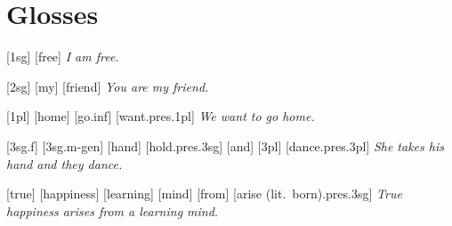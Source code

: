 \documentclass{article}
\begin{document}
\newpage\section{Glosses}

\ex[lingstyle=custom_nlevel]
\begingl
{}[{\sc 1sg}]
[free]
\glft \textit{I am free.}
\endgl
\xe

\ex[lingstyle=custom_nlevel]
\begingl
{}[{\sc 2sg}]
[my]
[friend]
\glft \textit{You are my friend.}
\endgl
\xe

\ex[lingstyle=custom_nlevel]
\begingl
{}[{\sc 1pl}]
[home]
[go.{\sc inf}]
[want.{\sc pres.1pl}]
\glft \textit{We want to go home.}
\endgl
\xe

\ex[lingstyle=custom_nlevel]
\begingl
{}[{\sc 3sg.f}]
[{\sc 3sg.m}-{\sc gen}]
[hand]
[hold.{\sc pres.3sg}]
[and]
[{\sc 3pl}]
[dance.{\sc pres.3pl}]
\glft \textit{She takes his hand and they dance.}
\endgl
\xe

\ex[lingstyle=custom_nlevel]
\begingl
{}[true]
[happiness]
[learning]
[mind]
[from]
[arise (lit.\ born).{\sc pres.3sg}]
\glft \textit{True happiness arises from a learning mind.}
\endgl
\xe
\end{document}

